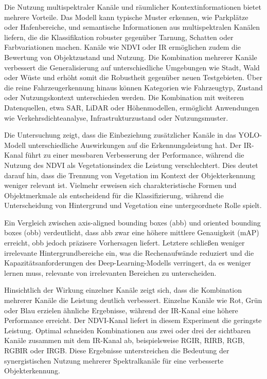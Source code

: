 Die Nutzung multispektraler Kanäle und räumlicher Kontextinformationen bietet mehrere Vorteile. Das Modell kann typische Muster erkennen, wie Parkplätze oder Hafenbereiche, und semantische Informationen aus multispektralen Kanälen liefern, die die Klassifikation robuster gegenüber Tarnung, Schatten oder Farbvariationen machen. Kanäle wie NDVI oder IR ermöglichen zudem die Bewertung von Objektzustand und Nutzung. Die Kombination mehrerer Kanäle verbessert die Generalisierung auf unterschiedliche Umgebungen wie Stadt, Wald oder Wüste und erhöht somit die Robustheit gegenüber neuen Testgebieten. Über die reine Fahrzeugerkennung hinaus können Kategorien wie Fahrzeugtyp, Zustand oder Nutzungskontext unterschieden werden. Die Kombination mit weiteren Datenquellen, etwa \acrshort{SAR}, \acrshort{LiDAR} oder Höhenmodellen, ermöglicht Anwendungen wie Verkehrsdichteanalyse, Infrastrukturzustand oder Nutzungsmuster.


Die Untersuchung zeigt, dass die Einbeziehung zusätzlicher Kanäle in das \acrshort{YOLO}-Modell unterschiedliche Auswirkungen auf die Erkennungsleistung hat. Der \acrshort{IR}-Kanal führt zu einer messbaren Verbesserung der Performance, während die Nutzung des \acrshort{NDVI} als Vegetationsindex die Leistung verschlechtert. Dies deutet darauf hin, dass die Trennung von Vegetation im Kontext der Objekterkennung weniger relevant ist. Vielmehr erweisen sich charakteristische Formen und Objektmerkmale als entscheidend für die Klassifizierung, während die Unterscheidung von Hintergrund und Vegetation eine untergeordnete Rolle spielt.  

Ein Vergleich zwischen axis-aligned bounding boxes (\acrshort{abb}) und oriented bounding boxes (\acrshort{obb}) verdeutlicht, dass \acrshort{abb} zwar eine höhere mittlere Genauigkeit (\acrshort{mAP}) erreicht, \acrshort{obb} jedoch präzisere Vorhersagen liefert. Letztere schließen weniger irrelevante Hintergrundbereiche ein, was die Rechenaufwände reduziert und die Kapazitätsanforderungen des Deep-Learning-Modells verringert, da es weniger lernen muss, relevante von irrelevanten Bereichen zu unterscheiden.  

Hinsichtlich der Wirkung einzelner Kanäle zeigt sich, dass die Kombination mehrerer Kanäle die Leistung deutlich verbessert. Einzelne Kanäle wie Rot, Grün oder Blau erzielen ähnliche Ergebnisse, während der \acrshort{IR}-Kanal eine höhere Performance erreicht. Der \acrshort{NDVI}-Kanal liefert in diesem Experiment die geringste Leistung. Optimal schneiden Kombinationen aus zwei oder drei der sichtbaren Kanäle zusammen mit dem \acrshort{IR}-Kanal ab, beispielsweise RGIR, RIRB, RGB, RGBIR oder IRGB. Diese Ergebnisse unterstreichen die Bedeutung der synergistischen Nutzung mehrerer Spektralkanäle für eine verbesserte Objekterkennung.  

